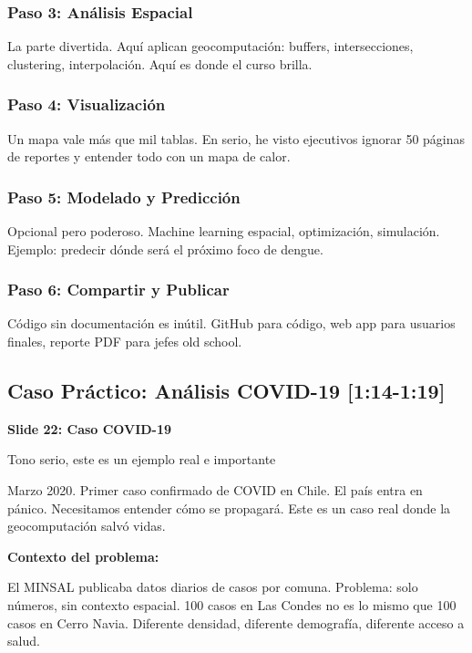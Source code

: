 \documentclass[11pt,a4paper]{article}
\newcommand{\tiempo}[1]{\textcolor{timecolor}{\faIcon{clock} \textbf{[#1]}}}
\newcommand{\decir}[1]{\begin{tcolorbox}[colback=blue!5,colframe=usachblue,title={\faIcon{microphone} DECIR}]#1\end{tcolorbox}}
\newcommand{\hacer}[1]{\begin{tcolorbox}[colback=green!5,colframe=green!50!black,title={\faIcon{hand-point-right} HACER}]#1\end{tcolorbox}}
\begin{document}
\subsubsection{Paso 3: Análisis Espacial}

\decir{La parte divertida. Aquí aplican geocomputación: buffers, intersecciones, clustering, interpolación. Aquí es donde el curso brilla.}

\subsubsection{Paso 4: Visualización}

\decir{Un mapa vale más que mil tablas. En serio, he visto ejecutivos ignorar 50 páginas de reportes y entender todo con un mapa de calor.}

\subsubsection{Paso 5: Modelado y Predicción}

\decir{Opcional pero poderoso. Machine learning espacial, optimización, simulación. Ejemplo: predecir dónde será el próximo foco de dengue.}

\subsubsection{Paso 6: Compartir y Publicar}

\decir{Código sin documentación es inútil. GitHub para código, web app para usuarios finales, reporte PDF para jefes old school.}

\subsection{Caso Práctico: Análisis COVID-19 \tiempo{1:14-1:19}}

\textbf{Slide 22: Caso COVID-19}

\hacer{Tono serio, este es un ejemplo real e importante}

\decir{Marzo 2020. Primer caso confirmado de COVID en Chile. El país entra en pánico. Necesitamos entender cómo se propagará. Este es un caso real donde la geocomputación salvó vidas.}

\textbf{Contexto del problema:}

\decir{El MINSAL publicaba datos diarios de casos por comuna. Problema: solo números, sin contexto espacial. 100 casos en Las Condes no es lo mismo que 100 casos en Cerro Navia. Diferente densidad, diferente demografía, diferente acceso a salud.}
\end{document}
